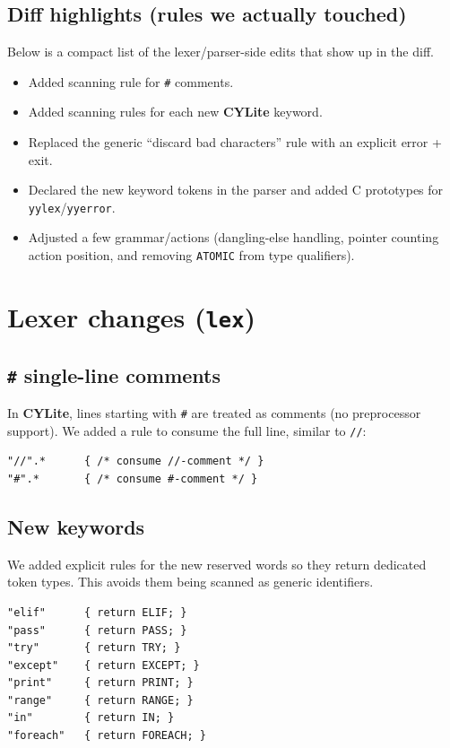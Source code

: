 \documentclass[11pt]{article}
\newcommand{\lang}{\textbf{CYLite}}
\begin{document}
\subsection*{Diff highlights (rules we actually touched)}
Below is a compact list of the lexer/parser-side edits that show up in the diff.
\begin{itemize}
	\item Added scanning rule for \texttt{\#} comments.
	\item Added scanning rules for each new \lang{} keyword.
	\item Replaced the generic ``discard bad characters'' rule with an explicit error + exit.
	\item Declared the new keyword tokens in the parser and added C prototypes for \texttt{yylex}/\texttt{yyerror}.
	\item Adjusted a few grammar/actions (dangling-else handling, pointer counting action position, and removing \texttt{ATOMIC} from type qualifiers).
\end{itemize}

\section{Lexer changes (\texttt{lex})}
\subsection{\texttt{\#} single-line comments}
In \lang{}, lines starting with \texttt{\#} are treated as comments (no preprocessor support).
We added a rule to consume the full line, similar to \texttt{//}:
\begin{lstlisting}
"//".*      { /* consume //-comment */ }
"#".*       { /* consume #-comment */ }
\end{lstlisting}

\subsection{New keywords}
We added explicit rules for the new reserved words so they return dedicated token types.
This avoids them being scanned as generic identifiers.
\begin{lstlisting}
"elif"      { return ELIF; }
"pass"      { return PASS; }
"try"       { return TRY; }
"except"    { return EXCEPT; }
"print"     { return PRINT; }
"range"     { return RANGE; }
"in"        { return IN; }
"foreach"   { return FOREACH; }
\end{lstlisting}
\end{document}
